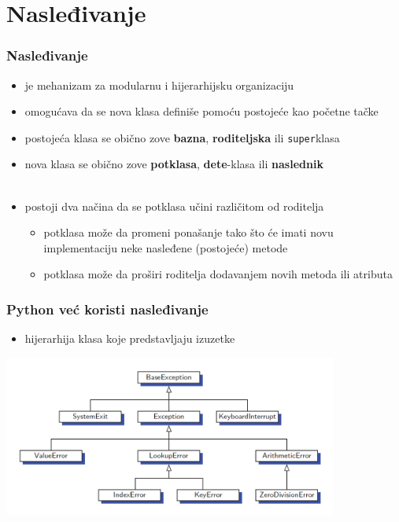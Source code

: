 \documentclass[compress,aspectratio=169]{beamer}
\begin{document}
\section[Nasleđivanje]{Nasleđivanje}
\begin{frame}[fragile]
  \frametitle{Nasleđivanje}
  \begin{itemize}
    \item {} je mehanizam za modularnu i hijerarhijsku organizaciju
    \item omogućava da se nova klasa definiše pomoću postojeće kao početne tačke
    \item postojeća klasa se obično zove \textbf{bazna}, \textbf{roditeljska} ili \texttt{super}klasa
    \item nova klasa se obično zove \textbf{potklasa}, \textbf{dete}-klasa ili \textbf{naslednik} \\ \ \\
    \item postoji dva načina da se potklasa učini različitom od roditelja
    \begin{itemize}
      \item potklasa može da promeni ponašanje tako što će imati novu implementaciju neke nasleđene (postojeće) metode
      \item potklasa može da proširi roditelja dodavanjem novih metoda ili atributa
    \end{itemize}
  \end{itemize}
\end{frame}

\begin{frame}[fragile]
  \frametitle{Python već koristi nasleđivanje}
  \begin{itemize}
    \item hijerarhija klasa koje predstavljaju izuzetke
  \end{itemize}
  \begin{center}
    \includegraphics[width=11cm]{asp-03-pic04.png}
  \end{center}
\end{frame}
\end{document}
